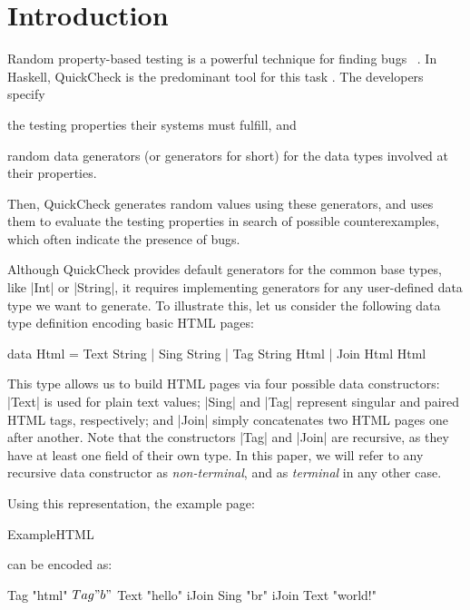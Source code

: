\section{Introduction}
\label{sec:intro}

%
Random property-based testing is a powerful technique for finding bugs
~\cite{ArtsHNS15, HughesPAN16, HughesNSA16, MidtgaardJKNN17}.
%
In Haskell, QuickCheck is the predominant tool for this task \cite{ClaessenH00}.
%
The developers specify
%
\begin{inparaenum}[(i)]
\item the testing properties their systems must fulfill, and
\item random data generators (or generators for short) for the data types
  involved at their properties.
\end{inparaenum}
%
Then, QuickCheck generates random values using these generators, and uses them
to evaluate the testing properties in search of possible counterexamples, which
often indicate the presence of bugs.


%
Although QuickCheck provides default generators for the common base types, like
|Int| or |String|, it requires implementing generators for any user-defined data
type we want to generate.
%
%
To illustrate this, let us consider the following data type definition encoding
basic HTML pages:

\begin{code}
data Html  =  Text  String
           |  Sing  String
           |  Tag   String Html
           |  Join  Html Html
\end{code}
%
This type allows us to build HTML pages via four possible data constructors:
|Text| is used for plain text values; |Sing| and |Tag| represent singular and
paired HTML tags, respectively; and |Join| simply concatenates two HTML pages
one after another.
%
Note that the constructors |Tag| and |Join| are recursive, as they have at least
one field of their own type.
%
In this paper, we will refer to any recursive data constructor as
\emph{non-terminal}, and as \emph{terminal} in any other case.


Using this representation, the example page:

\begin{code}
ExampleHTML
\end{code}
%
can be encoded as:
%
\begin{code}
Tag "html" $ Tag "b" $
  Text "hello" iJoin Sing "br" iJoin Text "world!"
\end{code} %


